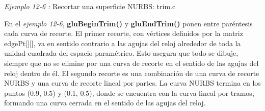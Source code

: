 \emph{Ejemplo 12-6 :} Recortar una superficie NURBS: trim.c




En el \emph{ejemplo 12-6}, \textbf{gluBeginTrim()} y \textbf{gluEndTrim()}
ponen entre paréntesis cada curva de recorte. El primer recorte, con
vértices definidos por la matriz edgePt[][], va en sentido contrario
a las agujas del reloj alrededor de toda la unidad cuadrada del espacio
paramétrico. Esto asegura que todo se dibuje, siempre que no se elimine
por una curva de recorte en el sentido de las agujas del reloj dentro
de él. El segundo recorte es una combinación de una curva de recorte
NURBS y una curva de recorte lineal por partes. La curva NURBS termina
en los puntos (0.9, 0.5) y (0.1, 0.5), donde se encuentra con la curva
lineal por tramos, formando una curva cerrada en el sentido de las agujas del reloj.
